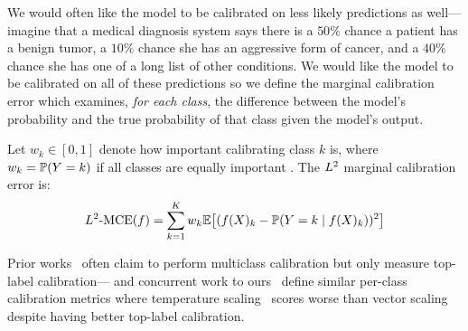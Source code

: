 We would often like the model to be calibrated on less likely predictions as well---imagine that a medical diagnosis system says there is a $50\%$ chance a patient has a benign tumor, a $10\%$ chance she has an aggressive form of cancer, and a $40\%$ chance she has one of a long list of other conditions. We would like the model to be calibrated on all of these predictions so we define the marginal calibration error which examines, \emph{for each class}, the difference between the model's probability and the true probability of that class given the model's output.

\begin{definition}
\label{dfn:marginal-ce}
  Let $w_k \in [0, 1]$ denote how important calibrating class $k$ is, where $w_k = \mathbb{P}(Y = k)$ if all classes are equally important . The $L^2$ marginal calibration error is:
\begin{align}
L^2\textup{-MCE}(f) = \sum_{k = 1}^K w_k \mathbb{E}\big[ (f(X)_k - \mathbb{P}(Y = k \mid f(X)_k))^2 \big]
\end{align}
\end{definition}

Prior works~\cite{guo2017calibration, hendrycks2019anomaly, hendrycks2019pretraining} often claim  to perform multiclass calibration but only measure top-label calibration---\cite{nixon2019calibration} and concurrent work to ours~\cite{kull2019temperature} define similar per-class calibration metrics where temperature scaling~\cite{guo2017calibration}  scores worse than vector scaling despite having better top-label calibration.


